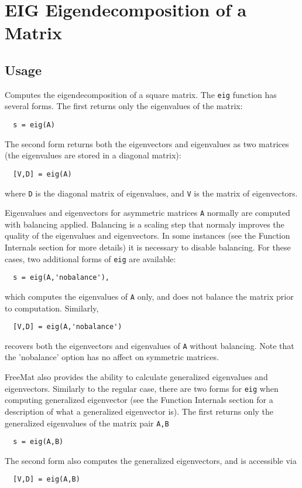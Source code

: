\section{EIG Eigendecomposition of a Matrix}

\subsection{Usage}

Computes the eigendecomposition of a square matrix.  The \verb|eig| function
has several forms.  The first returns only the eigenvalues of the matrix:
\begin{verbatim}
  s = eig(A)
\end{verbatim}
The second form returns both the eigenvectors and eigenvalues as two 
matrices (the eigenvalues are stored in a diagonal matrix):
\begin{verbatim}
  [V,D] = eig(A)
\end{verbatim}
where \verb|D| is the diagonal matrix of eigenvalues, and \verb|V| is the
matrix of eigenvectors.

Eigenvalues and eigenvectors for asymmetric matrices \verb|A| normally
are computed with balancing applied.  Balancing is a scaling step
that normaly improves the quality of the eigenvalues and eigenvectors.
In some instances (see the Function Internals section for more details)
it is necessary to disable balancing.  For these cases, two additional
forms of \verb|eig| are available:
\begin{verbatim}
  s = eig(A,'nobalance'),
\end{verbatim}
which computes the eigenvalues of \verb|A| only, and does not balance
the matrix prior to computation.  Similarly,
\begin{verbatim}
  [V,D] = eig(A,'nobalance')
\end{verbatim}
recovers both the eigenvectors and eigenvalues of \verb|A| without balancing.
Note that the 'nobalance' option has no affect on symmetric matrices.

FreeMat also provides the ability to calculate generalized eigenvalues
and eigenvectors.  Similarly to the regular case, there are two forms
for \verb|eig| when computing generalized eigenvector (see the Function
Internals section for a description of what a generalized eigenvector is).
The first returns only the generalized eigenvalues of the matrix
pair \verb|A,B|
\begin{verbatim}
  s = eig(A,B)
\end{verbatim}
The second form also computes the generalized eigenvectors, and is
accessible via
\begin{verbatim}
  [V,D] = eig(A,B)
\end{verbatim}
